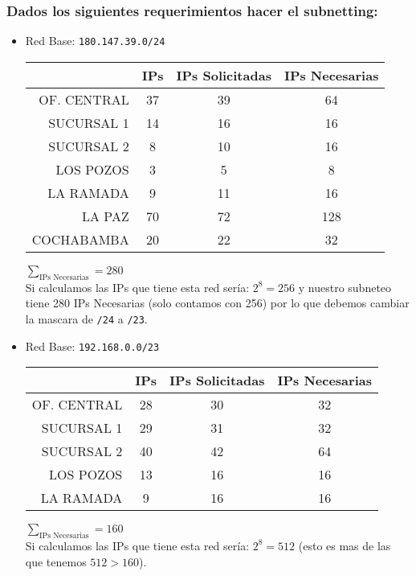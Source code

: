 \subsubsection*{Dados los siguientes requerimientos hacer el subnetting:}

\begin{itemize}
\item Red Base: \texttt{180.147.39.0/24}

\begin{table}[ht]
    \begin{tabular}{|r|c|c|c|}
        \hline
        ~           & IPs & IPs Solicitadas & IPs Necesarias \\ \hline
        OF. CENTRAL & 37  & 39              & 64             \\ 
        SUCURSAL 1  & 14  & 16              & 16             \\ 
        SUCURSAL 2  & 8   & 10              & 16             \\ 
        LOS POZOS   & 3   & 5               & 8              \\ 
        LA RAMADA   & 9   & 11              & 16             \\ 
        LA PAZ      & 70  & 72              & 128            \\ 
        COCHABAMBA  & 20  & 22              & 32             \\
        \hline
    \end{tabular}
\end{table}
$\sum_{\text{IPs Necesarias}}=280$ \\
Si calculamos las IPs que tiene esta red sería: $2^8=256$ y nuestro subneteo tiene 280 IPs Necesarias (solo contamos con 256) por lo que debemos cambiar la mascara de \texttt{/24} a \texttt{/23}.



\item Red Base: \texttt{192.168.0.0/23}

\begin{table}[ht]
    \begin{tabular}{|r|c|c|c|}
        \hline
        ~           & IPs & IPs Solicitadas & IPs Necesarias \\ \hline
        OF. CENTRAL & 28  & 30              & 32             \\ 
        SUCURSAL 1  & 29  & 31              & 32             \\ 
        SUCURSAL 2  & 40   & 42              & 64             \\ 
        LOS POZOS   & 13   & 16               & 16              \\ 
        LA RAMADA   & 9   & 16              & 16   
\\
        \hline
    \end{tabular}
\end{table}
$\sum_{\text{IPs Necesarias}}=160$\\
Si calculamos las IPs que tiene esta red sería: $2^8=512$ (esto es mas de las que tenemos $512>160$).
\begin{center}


\end{center}
\end{itemize}
